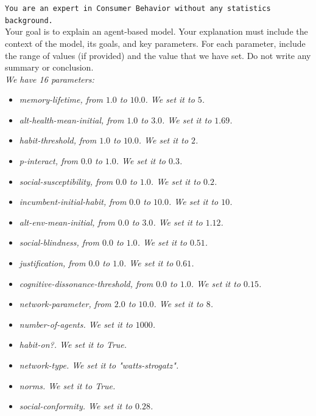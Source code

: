 \documentclass[preprint,12pt]{elsarticle}
\begin{document}
\begin{tcolorbox}[
    breakable, colback=white!95!gray, colframe=black, title=Prompt 1 : \texttt{text} is a feature from the design of experiment. \textit{text} is a part of the prompt changing according to the model and the experiment,  label=box:prompt1]
\texttt{You are an expert in Consumer Behavior without any statistics background.}\\

Your goal is to explain an agent-based model. Your explanation must include the context of the model, its goals, and key parameters. For each parameter, include the range of values (if provided) and the value that we have set. Do not write any summary or conclusion.\\

\textit{We have 16 parameters:}
\begin{itemize}[noitemsep, topsep=0pt]
    \item \textit{memory-lifetime, from $1.0$ to $10.0$. We set it to $5$.}
    \item \textit{alt-health-mean-initial, from $1.0$ to $3.0$. We set it to $1.69$.}
    \item \textit{habit-threshold, from $1.0$ to $10.0$. We set it to $2$.}
    \item \textit{p-interact, from $0.0$ to $1.0$. We set it to $0.3$.}
    \item \textit{social-susceptibility, from $0.0$ to $1.0$. We set it to $0.2$.}
    \item \textit{incumbent-initial-habit, from $0.0$ to $10.0$. We set it to $10$.}
    \item \textit{alt-env-mean-initial, from $0.0$ to $3.0$. We set it to $1.12$.}
    \item \textit{social-blindness, from $0.0$ to $1.0$. We set it to $0.51$.}
    \item \textit{justification, from $0.0$ to $1.0$. We set it to $0.61$.}
    \item \textit{cognitive-dissonance-threshold, from $0.0$ to $1.0$. We set it to $0.15$.}
    \item \textit{network-parameter, from $2.0$ to $10.0$. We set it to $8$.}
    \item \textit{number-of-agents. We set it to $1000$.}
    \item \textit{habit-on?. We set it to \textit{True}.}
    \item \textit{network-type. We set it to \textit{"watts-strogatz"}.}
    \item \textit{norms. We set it to \textit{True}.}
    \item \textit{social-conformity. We set it to $0.28$.}\\
\end{itemize}


\end{tcolorbox}
\end{document}
